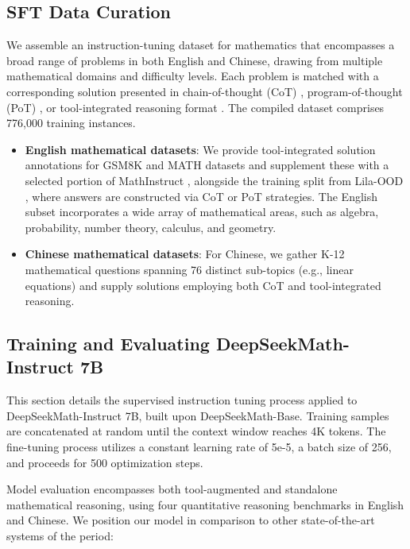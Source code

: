 \subsection{SFT Data Curation}

We assemble an instruction-tuning dataset for mathematics that encompasses a broad range of problems in both English and Chinese, drawing from multiple mathematical domains and difficulty levels. Each problem is matched with a corresponding solution presented in chain-of-thought (CoT) \citep{cot}, program-of-thought (PoT) \citep{pot,pal}, or tool-integrated reasoning format \citep{tora}. The compiled dataset comprises 776,000 training instances.

\begin{itemize}[topsep=0pt]
    \item \textbf{English mathematical datasets}: We provide tool-integrated solution annotations for GSM8K and MATH datasets and supplement these with a selected portion of MathInstruct \citep{MathInstruct}, alongside the training split from Lila-OOD \citep{lila}, where answers are constructed via CoT or PoT strategies. The English subset incorporates a wide array of mathematical areas, such as algebra, probability, number theory, calculus, and geometry.
    \item \textbf{Chinese mathematical datasets}: For Chinese, we gather K-12 mathematical questions spanning 76 distinct sub-topics (e.g., linear equations) and supply solutions employing both CoT and tool-integrated reasoning.
\end{itemize}

\subsection{Training and Evaluating DeepSeekMath-Instruct 7B}

This section details the supervised instruction tuning process applied to DeepSeekMath-Instruct 7B, built upon DeepSeekMath-Base. Training samples are concatenated at random until the context window reaches 4K tokens. The fine-tuning process utilizes a constant learning rate of 5e-5, a batch size of 256, and proceeds for 500 optimization steps.

Model evaluation encompasses both tool-augmented and standalone mathematical reasoning, using four quantitative reasoning benchmarks in English and Chinese. We position our model in comparison to other state-of-the-art systems of the period:

